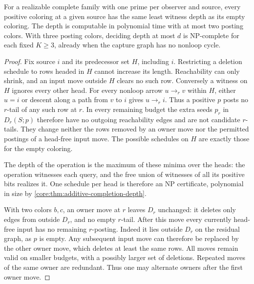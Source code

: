 \begin{corollary}
\label{core:cor:additive-depth-complexity}
For a realizable complete family with one prime per observer and
source, every positive coloring at a given source has the same least
witness depth as its empty coloring. The depth is computable in
polynomial time with at most two posting colors. With three posting
colors, deciding depth at most $d$ is NP-complete for each fixed
$K\ge3$, already when the capture graph has no nonloop cycle.
\end{corollary}
\begin{proof}
Fix source $i$ and its predecessor set $H$, including $i$.
Restricting a deletion schedule to rows headed in $H$ cannot increase
its length. Reachability can only shrink, and an input move outside
$H$ clears no such row. Conversely a witness on $H$ ignores every
other head. For every nonloop arrow $u\to_r v$ within $H$, either
$u=i$ or descent along a path from $v$ to $i$ gives $u\to_r i$.
Thus a positive $p$ posts no $r$-tail of any such row at $r$.
In every remaining budget the extra seeds $p_r$ in $D_r(S;p)$
therefore have no outgoing reachability edges and are not candidate
$r$-tails. They change neither the rows removed by an owner move nor
the permitted postings of a head-free input move. The possible
schedules on $H$ are exactly those for the empty coloring.

The depth of the operation is the maximum of these minima over the
heads: the operation witnesses each query, and the free union of
witnesses of all its positive bits realizes it. One schedule per head
is therefore an NP certificate, polynomial in size by
\cref{core:thm:additive-completion-depth}.

With two colors $b,c$, an owner move at $r$ leaves $D_r$ unchanged:
it deletes only edges from outside $D_r$, and no empty $r$-tail.
After this move every currently head-free input has no remaining
$r$-posting. Indeed it lies outside $D_r$ on the residual graph,
as $p$ is empty. Any subsequent input move can therefore be replaced
by the other owner move, which deletes at least the same rows.
All moves remain valid on smaller budgets, with a possibly larger
set of deletions. Repeated moves of the same owner are redundant.
Thus one may alternate owners after the first owner move.


\end{proof}
